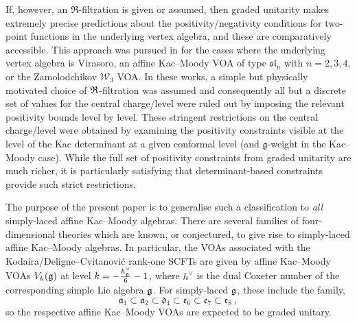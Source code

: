 If, however, an $\mathfrak{R}$-filtration is given or assumed, then graded unitarity makes extremely precise predictions about the positivity/negativity conditions for two-point functions in the underlying vertex algebra, and these are comparatively accessible. This approach was pursued in \cite{ArabiArdehali:2025fad, Beem:2026lkq} for the cases where the underlying vertex algebra is Virasoro, an affine Kac--Moody VOA of type $\mathfrak{sl}_n$ with $n=2,3,4$, or the Zamolodchikov $\mathcal{W}_3$ VOA. In these works, a simple but physically motivated choice of $\mathfrak{R}$-filtration was assumed and consequently all but a discrete set of values for the central charge/level were ruled out by imposing the relevant positivity bounds level by level. These stringent restrictions on the central charge/level were obtained by examining the positivity constraints visible at the level of the Kac determinant at a given conformal level (and $\mathfrak{g}$-weight in the Kac--Moody case). While the full set of positivity constraints from graded unitarity are much richer, it is particularly satisfying that determinant-based constraints provide such strict restrictions.

The purpose of the present paper is to generalise such a classification to \emph{all} simply-laced affine Kac--Moody algebras. There are several families of four-dimensional theories which are known, or conjectured, to give rise to simply-laced affine Kac--Moody algebras. In particular, the VOAs associated with the Kodaira/Deligne--Cvitanovi\'{c} rank-one SCFTs \cite{Seiberg:1994aj, Argyres:1995xn, Minahan:1996fg, Minahan:1996cj} are given by affine Kac--Moody VOAs $V_k(\mathfrak{g})$ at level $k = -\frac{h^\vee_{\mathfrak{g}}}{6}-1$, where $h^\vee$ is the dual Coxeter number of the corresponding simple Lie algebra $\mathfrak{g}$. For simply-laced $\mathfrak{g}$, these include the family,
\begin{equation}
    \mathfrak{a}_1 \subset \mathfrak{a}_2 \subset \mathfrak{d}_4 \subset \mathfrak{e}_6 \subset \mathfrak{e}_7 \subset \mathfrak{e}_8~,
\end{equation}
so the respective affine Kac--Moody VOAs are expected to be graded unitary. 

